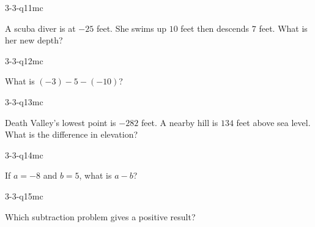 \begin{practiceQuestion}{3-3-q11}{mc}
\begin{questionText}
A scuba diver is at $-25$ feet. She swims up $10$ feet then descends $7$ feet. What is her new depth?
\end{questionText}
\end{practiceQuestion}

\begin{practiceQuestion}{3-3-q12}{mc}
\begin{questionText}
What is $(-3) - 5 - (-10)$?
\end{questionText}
\end{practiceQuestion}

\begin{practiceQuestion}{3-3-q13}{mc}
\begin{questionText}
Death Valley's lowest point is $-282$ feet. A nearby hill is $134$ feet above sea level. What is the difference in elevation?
\end{questionText}
\end{practiceQuestion}

\begin{practiceQuestion}{3-3-q14}{mc}
\begin{questionText}
If $a = -8$ and $b = 5$, what is $a - b$?
\end{questionText}
\end{practiceQuestion}

\begin{practiceQuestion}{3-3-q15}{mc}
\begin{questionText}
Which subtraction problem gives a positive result?
\end{questionText}
\end{practiceQuestion}

